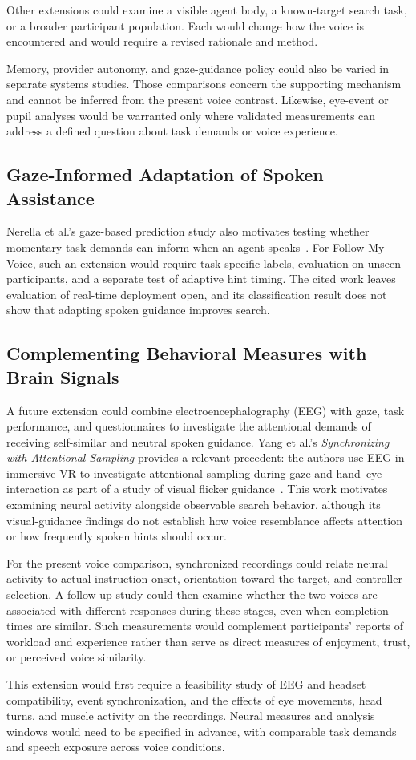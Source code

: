 Other extensions could examine a visible agent body, a known-target search task, or a broader participant population. Each would change how the voice is encountered and would require a revised rationale and method.

Memory, provider autonomy, and gaze-guidance policy could also be varied in separate systems studies. Those comparisons concern the supporting mechanism and cannot be inferred from the present voice contrast. Likewise, eye-event or pupil analyses would be warranted only where validated measurements can address a defined question about task demands or voice experience.

\subsection{Gaze-Informed Adaptation of Spoken Assistance}
Nerella et al.'s gaze-based prediction study also motivates testing whether momentary task demands can inform when an agent speaks~\cite{nerella2026gaze}. For Follow My Voice, such an extension would require task-specific labels, evaluation on unseen participants, and a separate test of adaptive hint timing. The cited work leaves evaluation of real-time deployment open, and its classification result does not show that adapting spoken guidance improves search.

\subsection{Complementing Behavioral Measures with Brain Signals}
A future extension could combine electroencephalography (EEG) with gaze, task performance, and questionnaires to investigate the attentional demands of receiving self-similar and neutral spoken guidance. Yang et al.'s \emph{Synchronizing with Attentional Sampling} provides a relevant precedent: the authors use EEG in immersive VR to investigate attentional sampling during gaze and hand--eye interaction as part of a study of visual flicker guidance~\cite{yang2026attentional}. This work motivates examining neural activity alongside observable search behavior, although its visual-guidance findings do not establish how voice resemblance affects attention or how frequently spoken hints should occur.

For the present voice comparison, synchronized recordings could relate neural activity to actual instruction onset, orientation toward the target, and controller selection. A follow-up study could then examine whether the two voices are associated with different responses during these stages, even when completion times are similar. Such measurements would complement participants' reports of workload and experience rather than serve as direct measures of enjoyment, trust, or perceived voice similarity.

This extension would first require a feasibility study of EEG and headset compatibility, event synchronization, and the effects of eye movements, head turns, and muscle activity on the recordings. Neural measures and analysis windows would need to be specified in advance, with comparable task demands and speech exposure across voice conditions.
